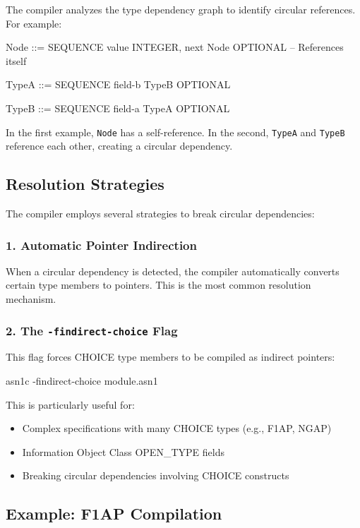 \documentclass[english,oneside,12pt]{book}
\begin{document}
The compiler analyzes the type dependency graph to identify circular references. 
For example:

\begin{asn}
Node ::= SEQUENCE {
    value   INTEGER,
    next    Node OPTIONAL     -- References itself
}

TypeA ::= SEQUENCE {
    field-b TypeB OPTIONAL
}

TypeB ::= SEQUENCE {
    field-a TypeA OPTIONAL
}
\end{asn}

In the first example, \texttt{Node} has a self-reference. In the second, \texttt{TypeA} 
and \texttt{TypeB} reference each other, creating a circular dependency.

\subsection*{Resolution Strategies}

The compiler employs several strategies to break circular dependencies:

\subsubsection*{1. Automatic Pointer Indirection}

When a circular dependency is detected, the compiler automatically converts certain 
type members to pointers. This is the most common resolution mechanism.

\subsubsection*{2. The \texttt{-findirect-choice} Flag}

This flag forces CHOICE type members to be compiled as indirect pointers:

\begin{bash}
asn1c -findirect-choice module.asn1
\end{bash}

This is particularly useful for:
\begin{itemize}
\item Complex specifications with many CHOICE types (e.g., F1AP, NGAP)
\item Information Object Class OPEN\_TYPE fields
\item Breaking circular dependencies involving CHOICE constructs
\end{itemize}

\subsection*{Example: F1AP Compilation}
\end{document}
